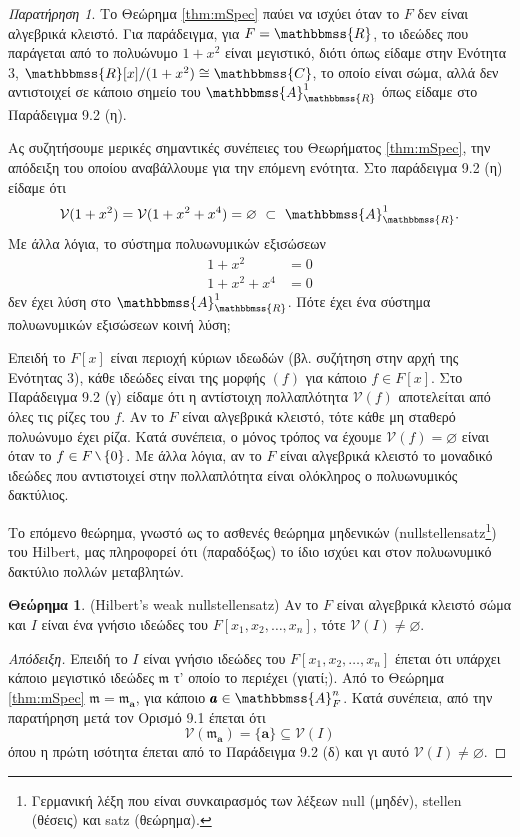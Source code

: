 \documentclass[12pt,a4paper,reqno]{amsart}
\theoremstyle{definition}
\newtheorem{theorem}{Θεώρημα}
\theoremstyle{remark}
\newtheorem*{remark}{Παρατήρηση}
\numberwithin{theorem}{section}
\numberwithin{exercise}{section}
\numberwithin{equation}{section}
\renewcommand{\AA}{\mathbbmss{A}}
\newcommand{\RR}{\mathbbmss{R}}
\newcommand{\CC}{\mathbbmss{C}}
\newcommand{\fm}{\mathfrak{m}}
\newcommand{\vV}{\mathcal{V}}
\newcommand{\bfa}{\pmb{a}}
\renewcommand{\emptyset}{\varnothing}
\newcommand{\Pol}[1]{F[x_1, x_2, \dots, x_{#1}]}
\newcommand{\mysetminusD}{\hbox{\tikz{\draw[line width=0.6pt,line cap=round] (3pt,0) -- (0,6pt);}}}
\newcommand{\mysetminusT}{\mysetminusD}
\newcommand{\mysetminusS}{\hbox{\tikz{\draw[line width=0.45pt,line cap=round] (2pt,0) -- (0,4pt);}}}
\newcommand{\mysetminusSS}{\hbox{\tikz{\draw[line width=0.4pt,line cap=round] (1.5pt,0) -- (0,3pt);}}}
\newcommand{\sm}{\mathbin{\mathchoice{\mysetminusD}{\mysetminusT}{\mysetminusS}{\mysetminusSS}}}
\begin{document}
\begin{remark}
  Το Θεώρημα \ref{thm:mSpec} παύει να ισχύει όταν το $F$ δεν είναι αλγεβρικά κλειστό. Για παράδειγμα, για $F = \RR$, το ιδεώδες που παράγεται από το πολυώνυμο $1 + x^2$ είναι μεγιστικό, διότι όπως είδαμε στην Ενότητα 3, $\RR[x]/(1+x^2) \cong \CC$, το οποίο είναι σώμα, αλλά δεν αντιστοιχεί σε κάποιο σημείο του $\AA_\RR^1$ όπως είδαμε στο Παράδειγμα 9.2 (η).
\end{remark}

Ας συζητήσουμε μερικές σημαντικές συνέπειες του Θεωρήματος \ref{thm:mSpec}, την απόδειξη του οποίου αναβάλλουμε για την επόμενη ενότητα. Στο παράδειγμα 9.2 (η) είδαμε ότι 
\[
\vV(1 + x^2) = \vV(1 + x^2 + x^4) = \emptyset \ \subset \ \AA_\RR^1.
\]
Με άλλα λόγια, το σύστημα πολυωνυμικών εξισώσεων 
\begin{align*}
  1 + x^2 &= 0 \\
  1 + x^2 + x^4&= 0 
\end{align*}
δεν έχει λύση στο $\AA_\RR^1$. Πότε έχει ένα σύστημα πολυωνυμικών εξισώσεων κοινή λύση;

Επειδή το $F[x]$ είναι περιοχή κύριων ιδεωδών (βλ. συζήτηση στην αρχή της Ενότητας 3), κάθε ιδεώδες είναι της μορφής $(f)$ για κάποιο $f \in F[x]$. Στο Παράδειγμα 9.2 (γ) είδαμε ότι η αντίστοιχη πολλαπλότητα $\vV(f)$ αποτελείται από όλες τις ρίζες του $f$. Αν το $F$ είναι αλγεβρικά κλειστό, τότε κάθε μη σταθερό πολυώνυμο έχει ρίζα. Κατά συνέπεια, ο μόνος τρόπος να έχουμε $\vV(f) = \emptyset$ είναι όταν το $f \in F\sm\{0\}$. Με άλλα λόγια, αν το $F$ είναι αλγεβρικά κλειστό το μοναδικό ιδεώδες που αντιστοιχεί στην  πολλαπλότητα είναι ολόκληρος ο πολυωνυμικός δακτύλιος.

Το επόμενο θεώρημα, γνωστό ως το ασθενές θεώρημα μηδενικών (nullstellensatz\footnote{Γερμανική λέξη που είναι συνκαιρασμός των λέξεων null (μηδέν), stellen (θέσεις) και satz (θεώρημα).}) του Hilbert, μας πληροφορεί ότι (παραδόξως) το ίδιο ισχύει και στον πολυωνυμικό δακτύλιο πολλών μεταβλητών. 
\begin{theorem}{\rm(Hilbert's weak nullstellensatz)}
  \label{thm:weak_nullstellensatz}
  Αν το $F$ είναι αλγεβρικά κλειστό σώμα και $I$ είναι ένα γνήσιο ιδεώδες του $F[x_1, x_2, \dots, x_n]$, τότε $\vV(I) \neq \emptyset$.
\end{theorem}

\begin{proof}[Απόδειξη]
  Επειδή το $I$ είναι γνήσιο ιδεώδες του $\Pol{n}$ έπεται ότι υπάρχει κάποιο μεγιστικό ιδεώδες $\fm$ τ' οποίο το περιέχει (γιατί;). Από το Θεώρημα \ref{thm:mSpec} $\fm = \fm_{\bfa}$, για κάποιο $\bfa \in \AA_F^n$. Κατά συνέπεια, από την παρατήρηση μετά τον Ορισμό 9.1 έπεται ότι 
  \[
  \vV(\fm_{\bfa}) = \{\bfa\} \subseteq \vV(I)
  \]
  όπου η πρώτη ισότητα έπεται από το Παράδειγμα 9.2 (δ) και γι αυτό $\vV(I) \neq \emptyset$.
\end{proof}
\end{document}

